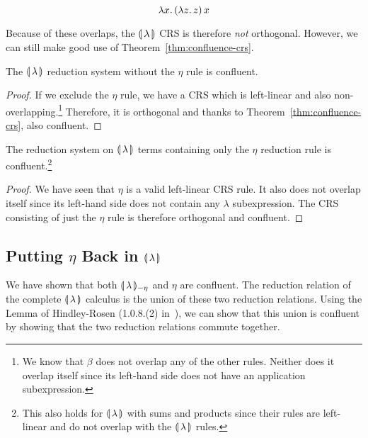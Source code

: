 $$
\lambda x.\, (\lambda z.\, z)\,x
$$

Because of these overlaps, the ${\llparenthesis \, \lambda \, \rrparenthesis}$ CRS is therefore \emph{not}
orthogonal. However, we can still make good use of
Theorem~\ref{thm:confluence-crs}.

\begin{lemma}\label{lem:confluence-int}

  The $\llparenthesis \, \lambda \, \rrparenthesis$ reduction system without the $\eta$ rule is
  confluent.
\end{lemma}

\begin{proof}
  If we exclude the $\eta$ rule, we have a CRS which is left-linear and
  also non-overlapping.\footnote{We know that $\beta$ does not overlap
    any of the other rules. Neither does it overlap itself since its
    left-hand side does not have an application subexpression.} Therefore,
  it is orthogonal and thanks to Theorem~\ref{thm:confluence-crs}, also
  confluent.
\end{proof}

\begin{lemma}\label{lem:confluence-eta}

  The reduction system on $\llparenthesis \, \lambda \, \rrparenthesis$ terms containing only the
  $\eta$ reduction rule is confluent.\footnote{This also holds for
    $\llparenthesis \, \lambda \, \rrparenthesis$ with sums and products since their rules are
    left-linear and do not overlap with the $\llparenthesis \, \lambda \, \rrparenthesis$ rules.}
\end{lemma}

\begin{proof}
  We have seen that $\eta$ is a valid left-linear CRS rule. It also
  does not overlap itself since its left-hand side does not contain any
  $\lambda$ subexpression. The CRS consisting of just the $\eta$ rule
  is therefore orthogonal and confluent.
\end{proof}


\subsection{Putting \texorpdfstring{$\eta$}{eta} Back in
  \texorpdfstring{$\llparenthesis \, \lambda \, \rrparenthesis$}{Our Calculus}}
\label{ssec:confluence-eta}

We have shown that both ${\llparenthesis \, \lambda \, \rrparenthesis_{-\eta}}$ and $\eta$ are confluent. The reduction
relation of the complete $\llparenthesis \, \lambda \, \rrparenthesis$ calculus is the union of these
two reduction relations. Using the Lemma of Hindley-Rosen (1.0.8.(2)
in~\cite{klop1992term}), we can show that this union is confluent by
showing that the two reduction relations commute together.


